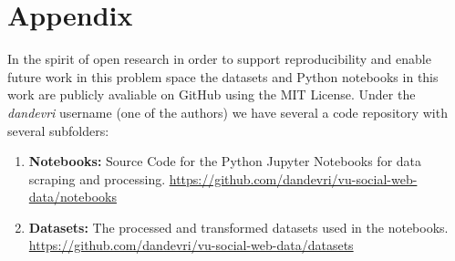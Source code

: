 \section{Appendix}

In the spirit of open research in order to support reproducibility and enable future work in this problem space the datasets and Python notebooks in this work are publicly avaliable on GitHub using the MIT License. Under the \textit{dandevri} username (one of the authors) we have several a code repository with several subfolders:

\begin{enumerate}
  \item \textbf{Notebooks:} Source Code for the Python  Jupyter Notebooks for data scraping and processing. \underline{https://github.com/dandevri/vu-social-web-data/notebooks}
  \item \textbf{Datasets:} The processed and transformed datasets used in the notebooks. \\  \underline{{https://github.com/dandevri/vu-social-web-data/datasets}}
\end{enumerate}